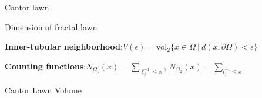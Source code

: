\documentclass{if-beamer}
\begin{document}
\begin{frame}{Cantor lawn}
	\begin{center}
	\end{center}
\end{frame}

\begin{frame}{Dimension of fractal lawn}

{\bf Inner-tubular neighborhood}:\quad $V(\epsilon) = \text{vol}_2\{x \in \Omega\ |\ d(x,\partial\Omega) < \epsilon\}$
\vspace{.2in}

{\bf Counting functions}:\quad $N_{\Omega_1}(x) = \sum_{\ell_j^{-1} \leq x}$, $N_{\Omega_2}(x) = \sum_{l_j^{-1} \leq x}$
\end{frame}

\begin{frame}{Cantor Lawn Volume}
	\begin{center}
	\end{center}
\end{frame}
\end{document}
